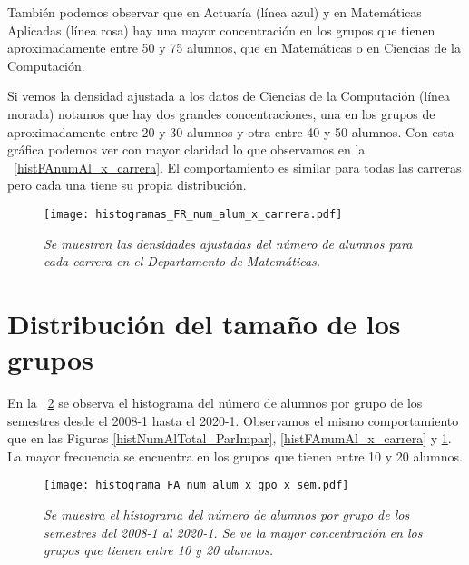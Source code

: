 También podemos observar que en Actuaría (línea azul) y en Matemáticas Aplicadas (línea rosa) hay una mayor concentración en los grupos que tienen aproximadamente entre 50 y 75 alumnos, que en Matemáticas o en Ciencias de la Computación.

Si vemos la densidad ajustada a los datos de Ciencias de la Computación (línea morada) notamos que hay dos grandes concentraciones, una en los grupos de aproximadamente entre 20 y 30 alumnos y otra entre 40 y 50 alumnos. Con esta gráfica podemos ver con mayor claridad lo que observamos en la \figurename{~\ref{histFAnumAl_x_carrera}}. El comportamiento es similar para todas las carreras pero cada una tiene su propia distribución.

\begin{figure}[H]
\centering
\texttt{[image: histogramas\_FR\_num\_alum\_x\_carrera.pdf]} %
\caption[\textit{Densidades del número de alumnos por carrera}]{\textit{Se muestran las densidades ajustadas del número de alumnos para cada carrera en el Departamento de Matemáticas.}}\label{histFRnumAl_x_carrera}
\end{figure}


\section{Distribución del tamaño de los grupos} \label{DitribTamGpos}

En la \figurename{~\ref{histNumAl_x_gpo_x_sem}} se observa el histograma del número de alumnos por grupo de los semestres desde el 2008-1 hasta el 2020-1. Observamos el mismo comportamiento que en las Figuras \ref{histNumAlTotal_ParImpar}, \ref{histFAnumAl_x_carrera} y \ref{histFRnumAl_x_carrera}. La mayor frecuencia se encuentra en los grupos que tienen entre 10 y 20 alumnos.

\begin{figure}[h]
\centering
\texttt{[image: histograma\_FA\_num\_alum\_x\_gpo\_x\_sem.pdf]} %
\caption[\textit{Histograma del número de alumnos por grupo de todos los semestres}]{\textit{Se muestra el histograma del número de alumnos por grupo de los semestres del 2008-1 al 2020-1. Se ve la mayor concentración en los grupos que tienen entre 10 y 20 alumnos.}}\label{histNumAl_x_gpo_x_sem}
\end{figure}

